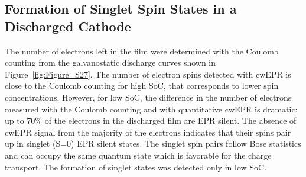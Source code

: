 \subsection{Formation of Singlet Spin States in a Discharged Cathode}
The number of electrons left in the film were determined with the Coulomb counting from the galvanostatic discharge curves shown in Figure~\ref{fig:Figure_S27}. The number of electron spins detected with cwEPR is close to the Coulomb counting for high SoC, that corresponds to lower spin concentrations. However, for low SoC, the difference in the number of electrons measured with the Coulomb counting and with quantitative cwEPR is dramatic: up to 70\% of the electrons in the discharged film are EPR silent. The absence of cwEPR signal from the majority of the electrons indicates that their spins pair up in singlet (S=0) EPR silent states. The singlet spin pairs follow Bose statistics and can occupy the same quantum state which is favorable for the charge transport. The formation of singlet states was detected only in low SoC.











